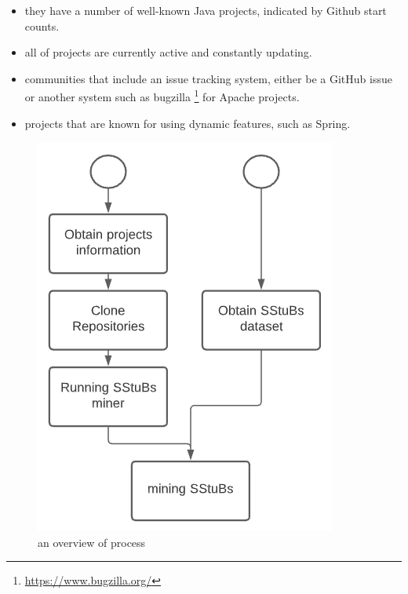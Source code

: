 \documentclass[sigconf,review,anonymous]{acmart}
\begin{document}
\begin{itemize}
\item they have a number of well-known Java projects, indicated by Github start counts.
\item all of projects are currently active and constantly updating.
\item communities that include an issue tracking system, either be a GitHub issue or another system such as bugzilla \footnote{\url{https://www.bugzilla.org/}} for Apache projects.
\item projects that are known for using dynamic features, such as Spring.
\end{itemize}

\begin{figure}[H]
  \centering
      \includegraphics[width=0.7\columnwidth]{figures/process.png}
  \caption{an overview of process}
  \label{fig:process}
\end{figure}
\end{document}
